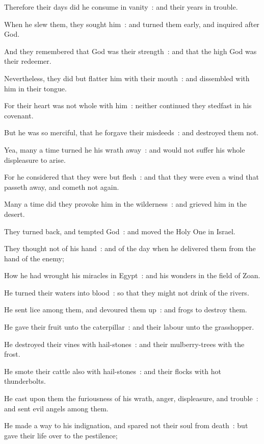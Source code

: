 Therefore their days did he consume in vanity~: and their years in trouble.\par
{}When he slew them, they sought him~: and turned them early, and inquired after God.\par
{}And they remembered that God was their strength~: and that the high God was their redeemer.\par
{}Nevertheless, they did but flatter him with their mouth~: and dissembled with him in their tongue.\par
{}For their heart was not whole with him~: neither continued they stedfast in his covenant.\par
{}But he was so merciful, that he forgave their misdeeds~: and destroyed them not.\par
{}Yea, many a time turned he his wrath away~: and would not suffer his whole displeasure to arise.\par
{}For he considered that they were but flesh~: and that they were even a wind that passeth away, and cometh not again.\par
{}Many a time did they provoke him in the wilderness~: and grieved him in the desert.\par
{}They turned back, and tempted God~: and moved the Holy One in Israel.\par
{}They thought not of his hand~: and of the day when he delivered them from the hand of the enemy;\par
{}How he had wrought his miracles in Egypt~: and his wonders in the field of Zoan.\par
{}He turned their waters into blood~: so that they might not drink of the rivers.\par
{}He sent lice among them, and devoured them up~: and frogs to destroy them.\par
{}He gave their fruit unto the caterpillar~: and their labour unto the grasshopper.\par
{}He destroyed their vines with hail-stones~: and their mulberry-trees with the frost.\par
{}He smote their cattle also with hail-stones~: and their flocks with hot thunderbolts.\par
{}He cast upon them the furiousness of his wrath, anger, displeasure, and trouble~: and sent evil angels among them.\par
{}He made a way to his indignation, and spared not their soul from death~: but gave their life over to the pestilence;\par
